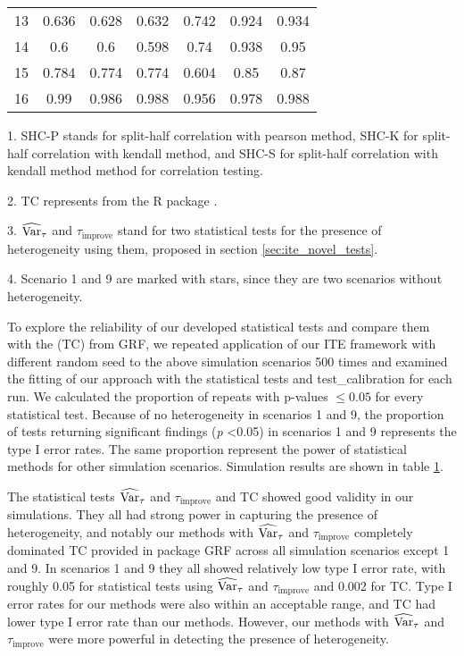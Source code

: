 \begin{table}[htbp]
\begin{threeparttable}
\begin{tabular}{c|cccccc}
          13    & 0.636 & 0.628 & 0.632 & 0.742 & 0.924 & 0.934 \\
          14    & 0.6   & 0.6   & 0.598 & 0.74  & 0.938 & 0.95 \\
          15    & 0.784 & 0.774 & 0.774 & 0.604 & 0.85  & 0.87 \\
          16    & 0.99  & 0.986 & 0.988 & 0.956 & 0.978 & 0.988 \\
          \bottomrule
          \end{tabular}%
          \begin{tablenotes}
            \small
            \item 1. SHC-P stands for split-half correlation with pearson method, SHC-K for split-half correlation with kendall method, and SHC-S for split-half correlation with kendall method method for correlation testing.
            \item 2. TC represents  from the R package .
            \item 3. $\operatorname{\widehat{Var}}_{\tau}$ and $\tau_{\mathrm{improve}}$ stand for two statistical tests for the presence of heterogeneity using them, proposed in section \ref{sec:ite_novel_tests}.
            \item 4. Scenario 1 and 9 are marked with stars, since they are two scenarios without heterogeneity.
          \end{tablenotes}
      \end{threeparttable}
    \label{Tab:ite_sim_res}%
    \end{table}%

    To explore the reliability of our developed statistical tests and compare them with the  (TC) from GRF, we repeated application of our ITE framework with different random seed to the above simulation scenarios 500 times and examined the fitting of our approach with the statistical tests and test\_calibration for each run. We calculated the proportion of repeats with p-values $\leq 0.05$ for every statistical test. Because of no heterogeneity in scenarios 1 and 9, the proportion of tests returning significant findings (\textit{p} <0.05)  in scenarios 1 and 9 represents the type I error rates. The same proportion represent the power of statistical methods for other simulation scenarios. Simulation results are shown in table \ref{Tab:ite_sim_res}.

    The statistical tests $\operatorname{\widehat{Var}}_{\tau}$ and $\tau_{\mathrm{improve}}$ and TC showed good validity in our simulations. They all had strong power in capturing the presence of heterogeneity, and notably our methods with $\operatorname{\widehat{Var}}_{\tau}$ and $\tau_{\mathrm{improve}}$ completely dominated TC provided in package GRF across all simulation scenarios except 1 and 9. In scenarios 1 and 9 they all showed relatively low type I error rate, with roughly 0.05 for statistical tests using $\operatorname{\widehat{Var}}_{\tau}$ and $\tau_{\mathrm{improve}}$ and 0.002 for TC. Type I error rates for our methods were also within an acceptable range, and TC had lower type I error rate than our methods. However, our methods with $\operatorname{\widehat{Var}}_{\tau}$ and $\tau_{\mathrm{improve}}$ were more powerful in detecting the presence of heterogeneity.


